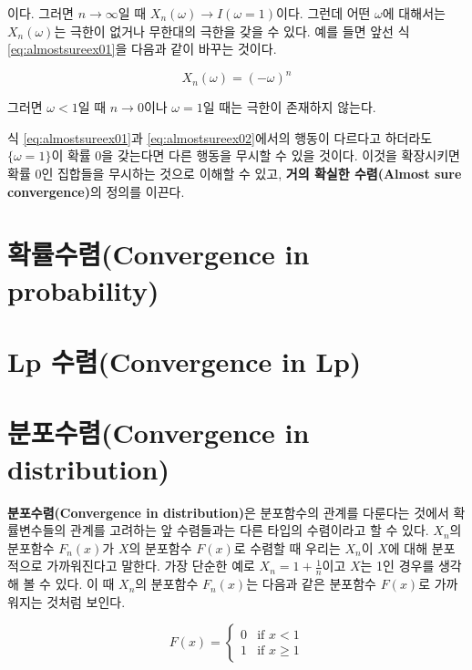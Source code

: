 \documentclass[b5paper,]{scrbook}
\theoremstyle{plain}
\theoremstyle{definition}
\numberwithin{equation}{section}
\begin{document}
이다. 그러면 \(n\rightarrow \infty\)일 때
\(X_{n}(\omega) \rightarrow I(\omega=1)\)이다. 그런데 어떤 \(\omega\)에
대해서는 \(X_{n}(\omega)\)는 극한이 없거나 무한대의 극한을 갖을 수 있다.
예를 들면 앞선 식 \eqref{eq:almostsureex01}을 다음과 같이 바꾸는 것이다.

\begin{equation}
X_{n}(\omega)=(-\omega)^{n}
\label{eq:almostsureex02}
\end{equation}

그러면 \(\omega < 1\)일 때 \(n\rightarrow 0\)이나 \(\omega=1\)일 때는
극한이 존재하지 않는다.

식 \eqref{eq:almostsureex01}과 \eqref{eq:almostsureex02}에서의 행동이
다르다고 하더라도 \(\{\omega=1\}\)이 확률 0을 갖는다면 다른 행동을
무시할 수 있을 것이다. 이것을 확장시키면 확률 0인 집합들을 무시하는
것으로 이해할 수 있고, \textbf{거의 확실한 수렴(Almost sure
convergence)}의 정의를 이끈다.

\section{확률수렴(Convergence in
probability)}\label{convergence-in-probability}

\section{Lp 수렴(Convergence in Lp)}\label{lp-convergence-in-lp}

\section{분포수렴(Convergence in
distribution)}\label{convergence-in-distribution}

\textbf{분포수렴(Convergence in distribution)}은 분포함수의 관계를
다룬다는 것에서 확률변수들의 관계를 고려하는 앞 수렴들과는 다른 타입의
수렴이라고 할 수 있다. \(X_{n}\)의 분포함수 \(F_{n}(x)\)가 \(X\)의
분포함수 \(F(x)\)로 수렴할 때 우리는 \(X_{n}\)이 \(X\)에 대해 분포적으로
가까워진다고 말한다. 가장 단순한 예로 \(X_{n}=1+\frac{1}{n}\)이고
\(X\)는 1인 경우를 생각해 볼 수 있다. 이 때 \(X_{n}\)의 분포함수
\(F_{n}(x)\)는 다음과 같은 분포함수 \(F(x)\)로 가까워지는 것처럼 보인다.

\begin{equation}
F(x)=
\begin{cases}
0 & \text{if } x < 1 \\
1 & \text{if } x \geq 1 
\end{cases}
\label{eq:distnconvex01}
\end{equation}
\end{document}
